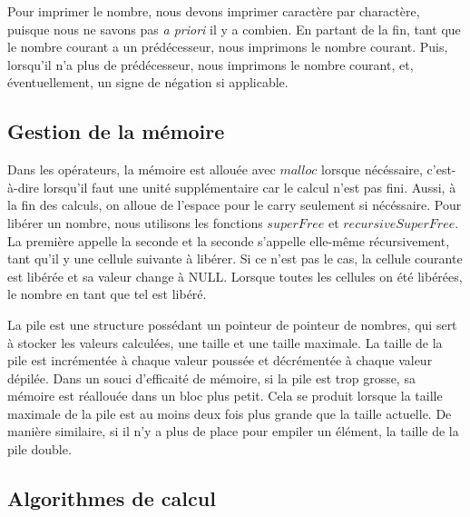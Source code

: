 \documentclass[letterpaper,12pt]{scrartcl}
\begin{document}
        Pour imprimer le nombre, nous devons imprimer caractère par charactère, puisque nous ne savons pas \textit{a priori} il y a combien. En partant de la fin, tant que le nombre courant a un prédécesseur, nous imprimons le nombre courant. Puis, lorsqu'il n'a plus de prédécesseur, nous imprimons le nombre courant, et, éventuellement, un signe de négation si applicable. 

        \subsection{Gestion de la mémoire}
        Dans les opérateurs, la mémoire est allouée avec $malloc$ lorsque nécéssaire, c'est-à-dire lorsqu'il faut une unité supplémentaire car le calcul n'est pas fini. Aussi, à la fin des calculs, on alloue de l'espace pour le carry seulement si nécéssaire. Pour libérer un nombre, nous utilisons les fonctions $superFree$ et $recursiveSuperFree$. La première appelle la seconde et la seconde s'appelle elle-même récursivement, tant qu'il y une cellule suivante à libérer. Si ce n'est pas le cas, la cellule courante est libérée et sa valeur change à NULL. Lorsque toutes les cellules on été libérées, le nombre en tant que tel est libéré.
        
        La pile est une structure possédant un pointeur de pointeur de nombres, qui sert à stocker les valeurs calculées, une taille et une taille maximale. La taille de la pile est incrémentée à chaque valeur poussée et décrémentée à chaque valeur dépilée. Dans un souci d'efficaité de mémoire, si la pile est trop grosse, sa mémoire est réallouée dans un bloc plus petit. Cela se produit lorsque la taille maximale de la pile est au moins deux fois plus grande que la taille actuelle. De manière similaire, si il n'y a plus de place pour empiler un élément, la taille de la pile double.
        
        \subsection{Algorithmes de calcul} \label{algos}
            
\end{document}
